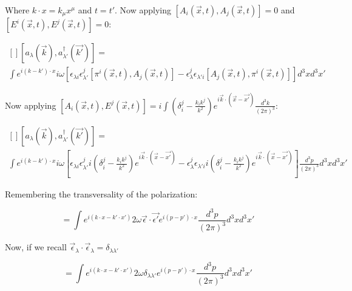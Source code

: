 \documentclass[a4]{article}
\begin{document}
    Where $k \cdot x = k_{\mu} x^{\mu}$ and $t = t'$. Now applying $[A_{i} (\vec{x}, t), A_{j} (\vec{x}, t)] = 0$ and 
    $[E^{i} (\vec{x}, t), E^{j} (\vec{x}, t)] = 0$:

    \begin{equation}
        \begin{aligned} []
            [a_{\lambda} (\vec{k}), a_{\lambda'}^{\dagger} (\vec{k'})] = \\
            \int e^{i (k-k') \cdot x} i \omega [\epsilon_{\lambda i} \epsilon_{\lambda'}^{j} [\pi^{i} (\vec{x}, t), A_{j} (\vec{x}, t)] - \epsilon_{\lambda}^{j} \epsilon_{\lambda' i} [A_{j} (\vec{x}, t), \pi^{i} (\vec{x}, t)]] d^{3} x d^{3} x'
        \end{aligned}
    \end{equation}

    Now applying $[A_{i} (\vec{x}, t), E^{j} (\vec{x}, t)] = i \int (\delta_{i}^{j} - \frac{k_i k^j}{k^2}) e^{i \vec{k} \cdot (\vec{x} - \vec{x'})} \frac{d^3 k}{(2 \pi)^3}$:

    \begin{equation}
        \begin{aligned} []
            [a_{\lambda} (\vec{k}), a_{\lambda'}^{\dagger} (\vec{k'})] = \\
            \int e^{i (k-k') \cdot x} i \omega [\epsilon_{\lambda i} \epsilon_{\lambda'}^{j} i (\delta_{i}^{j} - \frac{k_i k^j}{k^2}) e^{i \vec{k} \cdot (\vec{x} - \vec{x'})} - \epsilon_{\lambda}^{j} \epsilon_{\lambda' i} i (\delta_{i}^{j} - \frac{k_i k^j}{k^2}) e^{i \vec{k} \cdot (\vec{x} - \vec{x'})}] \frac{d^3 p}{(2 \pi)^3} d^{3} x d^{3} x'
        \end{aligned}
    \end{equation}

    Remembering the transversality of the polarization:

    \begin{equation}
        [a_{\lambda} (\vec{k}), a_{\lambda'}^{\dagger} (\vec{k'})] = \int e^{i (k  \cdot x -k'  \cdot x')} 2 \omega \vec{\epsilon} \cdot \vec{\epsilon'} e^{i (p-p') \cdot x} \frac{d^3 p}{(2 \pi)^3} d^{3} x d^{3} x'
    \end{equation}

    Now, if we recall $\vec{\epsilon}_{\lambda} \cdot \vec{\epsilon}_{\lambda} = \delta_{\lambda \lambda'}$

    \begin{equation}
        [a_{\lambda} (\vec{k}), a_{\lambda'}^{\dagger} (\vec{k'})] = \int e^{i (k  \cdot x -k'  \cdot x')} 2 \omega \delta_{\lambda \lambda'} e^{i (p-p') \cdot x} \frac{d^3 p}{(2 \pi)^3} d^{3} x d^{3} x'
    \end{equation}
\end{document}
